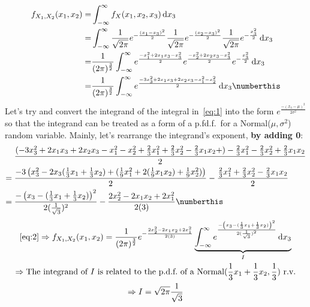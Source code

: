 \documentclass{mthe353answer}
\begin{document}
\begin{questions}
  \setcounter{question}{1}
  \question{}
  \begin{align*}
    f_{X_1,X_2}(x_1,x_2) =& \int_{-\infty}^{\infty} f_X(x_1,x_2,x_3) \,\mathrm{d}x_3\\
    =& \int_{-\infty}^{\infty} \frac{1}{\sqrt{2\pi}} e^{-\frac{(x_1-x_3)^2}{2}} \frac{1}{\sqrt{2\pi}} e^{-\frac{(x_2-x_3)^2}{2}} \frac{1}{\sqrt{2\pi}} e^{-\frac{x_3^2}{2}} \,\mathrm{d}x_3\\
    =& \frac{1}{(2\pi)^\frac{3}{2}} \int_{-\infty}^{\infty} e^{\frac{-x_1^2+2x_1x_3-x_3^2}{2}} e^{\frac{-x_2^2+2x_2x_3-x_3^2}{2}} e^{-\frac{x_3^2}{2}} \,\mathrm{d}x_3\\
    =& \frac{1}{(2\pi)^\frac{3}{2}} \int_{-\infty}^{\infty} e^{\frac{-3x_3^2+2x_1x_3+2x_2x_3-x_1^2-x_2^2}{2}} \,\mathrm{d}x_3 \numberthis \label{eq:1}
  \end{align*}
  Let's try and convert the integrand of the integral in~\eqref{eq:1} into the 
  form \(e^\frac{-(x_3-\mu)^2}{2\sigma^2}\) so that the integrand can be treated 
  as a form of a p.fd.f.\ for a Normal(\(\mu,\sigma^2\)) 
  random variable. Mainly, let's rearrange the integrand's exponent, \textbf{by adding 0}:
  \begin{align*}
     &\; \frac{(-3x_3^2+2x_1x_3+2x_2x_3-x_1^2-x_2^2+\frac{2}{3}x_1^2+\frac{2}{3}x_2^2-\frac{2}{3}x_1x_2+)-\frac{2}{3}x_1^2-\frac{2}{3}x_2^2+\frac{2}{3}x_1x_2}{2}\\
    =&\; \frac{-3\left(x_3^2 - 2x_3(\frac{1}{3}x_1+\frac{1}{3}x_2) + (\frac{1}{9}x_1^2 + 2(\frac{1}{9}x_1x_2) + \frac{1}{9}x_2^2)\right)}{2} - \frac{\frac{2}{3}x_1^2 + \frac{2}{3}x_2^2 - \frac{2}{3}x_1x_2}{2}\\
    =&\; \frac{-\left(x_3-(\frac{1}{3}x_1+\frac{1}{3}x_2)\right)^2}{2(\frac{1}{\sqrt{3}})^2} - \frac{2x_2^2-2x_1x_2+2x_1^2}{2(3)} \numberthis \label{eq:2}
  \end{align*}
  \begin{gather*}
    \text{\eqref{eq:2}} \Rightarrow f_{X_1,X_2}(x_1,x_2) = \frac{1}{(2\pi)^\frac{3}{2}} e^{-\frac{2x_2^2-2x_1x_2+2x_1^2}{2(3)}} 
      \underbrace{\int_{-\infty}^{\infty} e^{\frac{-\left(x_3-(\frac{1}{3}x_1+\frac{1}{3}x_2)\right)^2}{2(\frac{1}{\sqrt{3}})^2}} \,\mathrm{d}x_3}_{I}\\
    \Rightarrow \text{The integrand of \(I\) is related to the p.d.f.\ of a Normal(\(\frac{1}{3}x_1+\frac{1}{3}x_2, \frac{1}{3}\)) r.v.}\\
    \Rightarrow I = \sqrt{2\pi}\frac{1}{\sqrt{3}}\\

\end{gather*}
\end{questions}
\end{document}
